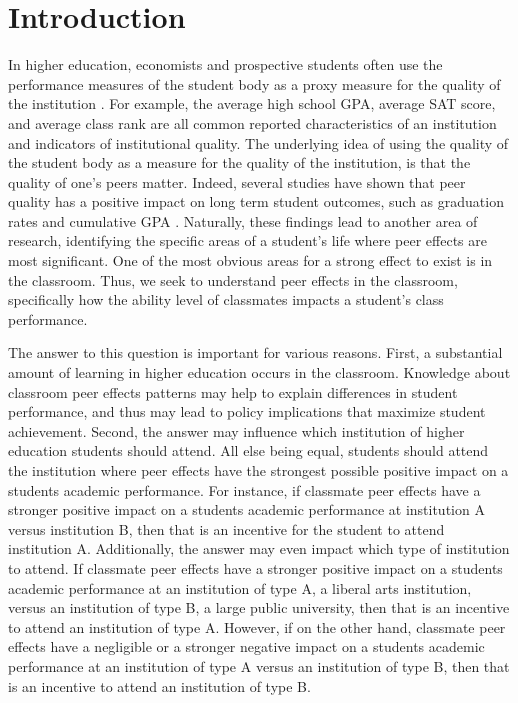 \documentclass[12pt,letterpaper,english,fleqn]{article}
\date{March 2016}
\begin{document}

\doublespacing





\section{Introduction}\label{intro}

In higher education, economists and prospective students often use the performance measures of the student body as a proxy measure for the quality of the institution \citep{smith2015new,sarmiento2015quality,black2006estimating}.
For example, the average high school GPA, average SAT score, and average class rank are all common reported characteristics of an institution and indicators of institutional quality.
The underlying idea of using the quality of the student body as a measure for the quality of the institution, is that the quality of one's peers matter. 
Indeed, several studies have shown that peer quality has a positive impact on long term student outcomes, such as graduation rates and cumulative GPA \citep{smith2015new,luppino2015college,ost2010role}. 
Naturally, these findings lead to another area of research, identifying the specific areas of a student's life where peer effects are most significant. 
One of the most obvious areas for a strong effect to exist is in the classroom.
Thus, we seek to understand peer effects in the classroom, specifically how the ability level of classmates impacts a student's class performance.

The answer to this question is important for various reasons. 
First, a substantial amount of learning in higher education occurs in the classroom. 
Knowledge about classroom peer effects patterns may help to explain differences in student performance, and thus may lead to policy implications that maximize student achievement. 
Second, the answer may influence which institution of higher education students should attend. 
All else being equal, students should attend the institution where peer effects have the strongest possible positive impact on a students academic performance. 
For instance, if classmate peer effects have a stronger positive impact on a students academic performance at institution A versus institution B, then that is an incentive for the student to attend institution A. 
Additionally, the answer may even impact which type of institution to attend.
If classmate peer effects have a stronger positive impact on a students academic performance at an institution of type A, a liberal arts institution, versus an institution of type B, a large public university, then that is an incentive to attend an institution of type A. 
However, if on the other hand, classmate peer effects have a negligible or a stronger negative impact on a students academic performance at an institution of type A versus an institution of type B, then that is an incentive to attend an institution of type B. 
\end{document}
